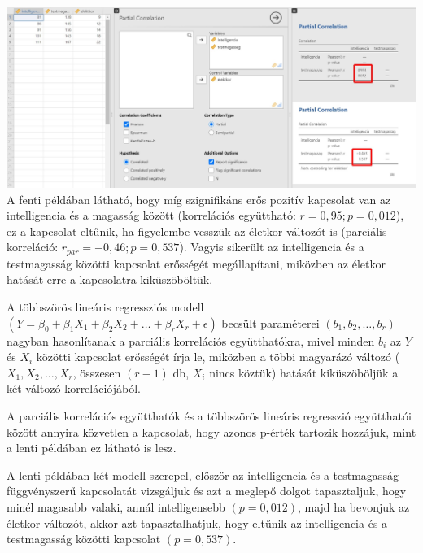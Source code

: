 \documentclass[
  letterpaper,
]{krantz}
\begin{document}
\includegraphics{./images/lin_reg_intelligencia_testmagassag_eletkor_01_kep_01.jpg}
A fenti példában látható, hogy míg szignifikáns erős pozitív kapcsolat
van az intelligencia és a magasság között (korrelációs együttható:
\(r=0,95; p=0,012\)), ez a kapcsolat eltűnik, ha figyelembe vesszük az
életkor változót is (parciális korreláció: \(r_{par}=-0,46; p=0,537\)).
Vagyis sikerült az intelligencia és a testmagasság közötti kapcsolat
erősségét megállapítani, miközben az életkor hatását erre a kapcsolatra
kiküszöböltük.

A többszörös lineáris regressziós modell
\((Y=\beta_0+\beta_1 X_1+\beta_2 X_2+\dots+\beta_r X_r+\epsilon)\)
becsült paraméterei \((b_1,b_2,…,b_r)\) nagyban hasonlítanak a parciális
korrelációs együtthatókra, mivel minden \(b_i\) az \(Y\) és \(X_i\)
közötti kapcsolat erősségét írja le, miközben a többi magyarázó változó
(\(X_1,X_2,\dots,X_r\), összesen \((r-1)\) db, \(X_i\) nincs köztük)
hatását kiküszöböljük a két változó korrelációjából.

A parciális korrelációs együtthatók és a többszörös lineáris regresszió
együtthatói között annyira közvetlen a kapcsolat, hogy azonos p-érték
tartozik hozzájuk, mint a lenti példában ez látható is lesz.

A lenti példában két modell szerepel, először az intelligencia és a
testmagasság függvényszerű kapcsolatát vizsgáljuk és azt a meglepő
dolgot tapasztaljuk, hogy minél magasabb valaki, annál intelligensebb
\((p=0,012)\), majd ha bevonjuk az életkor változót, akkor azt
tapasztalhatjuk, hogy eltűnik az intelligencia és a testmagasság közötti
kapcsolat \((p=0,537)\).
\end{document}
